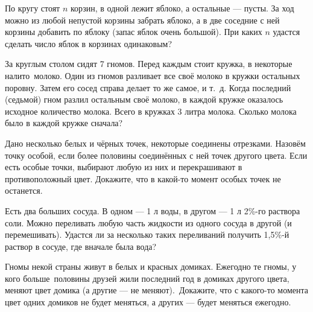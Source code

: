 \documentclass[a4paper,12pt]{article}
\begin{document}





По кругу стоят $n$ корзин, в одной %
лежит яблоко,
а остальные --- пусты. За ход %
можно из любой непустой
корзины забрать  %
яблоко, а в две соседние с ней корзины
добавить по яблоку (запас яблок очень большой).
При каких $n$ удастся %
сделать число яблок в корзинах одинаковым?

За круглым столом сидят 7 гномов. Перед каждым стоит кружка,
в некоторые налито~молоко. Один из гномов разливает
все своё молоко в кружки остальных поровну. Затем его сосед справа
делает то же самое, и т.~д. Когда последний (седьмой) гном разлил остальным своё молоко, в каждой кружке оказалось исходное количество молока. Всего в кружках 3 литра молока. Сколько молока было в каждой кружке сначала?

Дано несколько белых и чёрных точек, некоторые соединены отрезками.
Назовём точку особой, если более половины соединённых с ней точек %
другого цвета.
Если есть особые точки, выбирают
любую из них и
перекрашивают в противоположный
цвет. %
Докажите, что %
в какой-то момент
особых точек не останется.

Есть два %
больших сосуда. В одном --- 1 л воды, в другом --- 1 л
2\%-го раствора соли. %
Можно переливать любую
часть жидкости из одного сосуда в другой (и перемешивать).
Удастся ли за несколько таких переливаний получить 1,5\%-й
раствор в сосуде, где вначале была вода?

Гномы некой страны живут в белых и красных домиках. Ежегодно
те гномы, у кого больше~поло\-вины друзей жили последний год в домиках другого цвета, меняют цвет домика (а другие --- не меняют).~Дока\-жите, что с какого-то момента цвет одних
домиков %
не будет меняться,
а других --- будет меняться ежегодно. %
\end{document}
